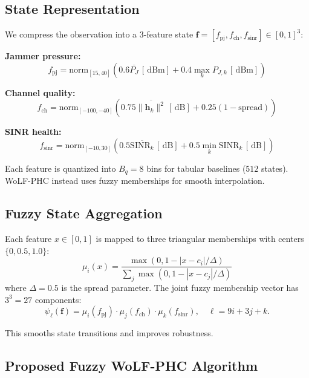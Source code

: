 \documentclass[journal,twocolumn]{IEEEtran}
\newcommand{\vect}[1]{\mathbf{#1}}
\newcommand{\dBm}{\,\text{dBm}}
\newcommand{\dB}{\,\text{dB}}
\begin{document}
\subsection{State Representation}

We compress the observation into a 3-feature state $\vect{f} = [f_{\text{pj}}, f_{\text{ch}}, f_{\text{sinr}}] \in [0,1]^3$:

\textbf{Jammer pressure:}
\begin{equation}
f_{\text{pj}} = \text{norm}_{[15,40]}\!\left(0.6\overline{P_J}\,[\dBm] + 0.4\max_k P_{J,k}\,[\dBm]\right)
\end{equation}

\textbf{Channel quality:}
\begin{equation}
f_{\text{ch}} = \text{norm}_{[-100,-40]}\!\left(0.75\overline{\|\vect{h}_k\|^2}\,[\dB] + 0.25(1 - \text{spread})\right)
\end{equation}

\textbf{SINR health:}
\begin{equation}
f_{\text{sinr}} = \text{norm}_{[-10,30]}\!\left(0.5\overline{\text{SINR}_k}\,[\dB] + 0.5\min_k\text{SINR}_k\,[\dB]\right)
\end{equation}

Each feature is quantized into $B_q=8$ bins for tabular baselines ($512$ states). WoLF-PHC instead uses fuzzy memberships for smooth interpolation.

\subsection{Fuzzy State Aggregation}

Each feature $x \in [0,1]$ is mapped to three triangular memberships with centers $\{0,0.5,1.0\}$:
\begin{equation}
\mu_i(x) = \frac{\max(0, 1 - |x - c_i|/\Delta)}{\sum_j \max(0, 1 - |x - c_j|/\Delta)}
\label{eq:fuzzy}
\end{equation}
where $\Delta = 0.5$ is the spread parameter. The joint fuzzy membership vector has $3^3 = 27$ components:
\begin{equation}
\psi_\ell(\vect{f}) = \mu_i(f_{\text{pj}}) \cdot \mu_j(f_{\text{ch}}) \cdot \mu_k(f_{\text{sinr}}), \quad \ell = 9i + 3j + k.
\label{eq:fuzzy_joint}
\end{equation}

This smooths state transitions and improves robustness.

\subsection{Proposed Fuzzy WoLF-PHC Algorithm}
\end{document}
